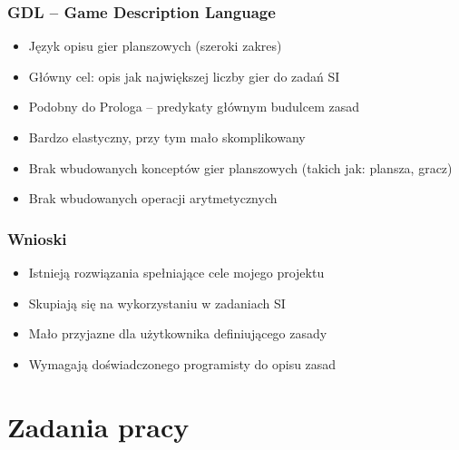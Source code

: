 \documentclass{beamer}
\begin{document}
\begin{frame}
	\frametitle{GDL -- Game Description Language\cite{GDL}}
	\begin{itemize}
		\item Język opisu gier planszowych (szeroki zakres)
		\item Główny cel: opis jak największej liczby gier do zadań SI
		\item Podobny do Prologa -- predykaty głównym budulcem zasad
		\item Bardzo elastyczny, przy tym mało skomplikowany
		\item Brak wbudowanych konceptów gier planszowych (takich jak: plansza, gracz)
		\item Brak wbudowanych operacji arytmetycznych
	\end{itemize}
\end{frame}

\begin{frame}
	\frametitle{Wnioski}
	\begin{itemize}
		\item Istnieją rozwiązania spełniające cele mojego projektu
		\item Skupiają się na wykorzystaniu w zadaniach SI
		\item Mało przyjazne dla użytkownika definiującego zasady
		\item Wymagają doświadczonego programisty do opisu zasad
	\end{itemize}
\end{frame}

\section{Zadania pracy}
\end{document}
